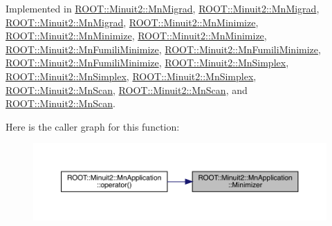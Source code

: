 Implemented in \mbox{\hyperlink{classROOT_1_1Minuit2_1_1MnMigrad_a98fa0ce74bf180a287093ac677e8644c}{R\+O\+O\+T\+::\+Minuit2\+::\+Mn\+Migrad}}, \mbox{\hyperlink{classROOT_1_1Minuit2_1_1MnMigrad_a98fa0ce74bf180a287093ac677e8644c}{R\+O\+O\+T\+::\+Minuit2\+::\+Mn\+Migrad}}, \mbox{\hyperlink{classROOT_1_1Minuit2_1_1MnMigrad_a98fa0ce74bf180a287093ac677e8644c}{R\+O\+O\+T\+::\+Minuit2\+::\+Mn\+Migrad}}, \mbox{\hyperlink{classROOT_1_1Minuit2_1_1MnMinimize_a879bb789f98c72f9a90a327fc7bb48fd}{R\+O\+O\+T\+::\+Minuit2\+::\+Mn\+Minimize}}, \mbox{\hyperlink{classROOT_1_1Minuit2_1_1MnMinimize_a879bb789f98c72f9a90a327fc7bb48fd}{R\+O\+O\+T\+::\+Minuit2\+::\+Mn\+Minimize}}, \mbox{\hyperlink{classROOT_1_1Minuit2_1_1MnMinimize_a879bb789f98c72f9a90a327fc7bb48fd}{R\+O\+O\+T\+::\+Minuit2\+::\+Mn\+Minimize}}, \mbox{\hyperlink{classROOT_1_1Minuit2_1_1MnFumiliMinimize_a96eb0cf96ae7ec874f912b6d2b3e7990}{R\+O\+O\+T\+::\+Minuit2\+::\+Mn\+Fumili\+Minimize}}, \mbox{\hyperlink{classROOT_1_1Minuit2_1_1MnFumiliMinimize_a96eb0cf96ae7ec874f912b6d2b3e7990}{R\+O\+O\+T\+::\+Minuit2\+::\+Mn\+Fumili\+Minimize}}, \mbox{\hyperlink{classROOT_1_1Minuit2_1_1MnFumiliMinimize_a96eb0cf96ae7ec874f912b6d2b3e7990}{R\+O\+O\+T\+::\+Minuit2\+::\+Mn\+Fumili\+Minimize}}, \mbox{\hyperlink{classROOT_1_1Minuit2_1_1MnSimplex_a8fa3495353e667d85e7dbeaffa94b94c}{R\+O\+O\+T\+::\+Minuit2\+::\+Mn\+Simplex}}, \mbox{\hyperlink{classROOT_1_1Minuit2_1_1MnSimplex_a8fa3495353e667d85e7dbeaffa94b94c}{R\+O\+O\+T\+::\+Minuit2\+::\+Mn\+Simplex}}, \mbox{\hyperlink{classROOT_1_1Minuit2_1_1MnSimplex_a8fa3495353e667d85e7dbeaffa94b94c}{R\+O\+O\+T\+::\+Minuit2\+::\+Mn\+Simplex}}, \mbox{\hyperlink{classROOT_1_1Minuit2_1_1MnScan_a9bebaf56360ff70aac6f47590227d8b5}{R\+O\+O\+T\+::\+Minuit2\+::\+Mn\+Scan}}, \mbox{\hyperlink{classROOT_1_1Minuit2_1_1MnScan_a9bebaf56360ff70aac6f47590227d8b5}{R\+O\+O\+T\+::\+Minuit2\+::\+Mn\+Scan}}, and \mbox{\hyperlink{classROOT_1_1Minuit2_1_1MnScan_a9bebaf56360ff70aac6f47590227d8b5}{R\+O\+O\+T\+::\+Minuit2\+::\+Mn\+Scan}}.

Here is the caller graph for this function\+:
\nopagebreak
\begin{figure}[H]
\begin{center}
\leavevmode
\includegraphics[width=350pt]{df/dd5/classROOT_1_1Minuit2_1_1MnApplication_a5a8e1e2658b731b5f4023dd1b1594223_icgraph}
\end{center}
\end{figure}
\mbox{\label{classROOT_1_1Minuit2_1_1MnApplication_a415948149d0f79b43adccc1cb7040e10}} 
